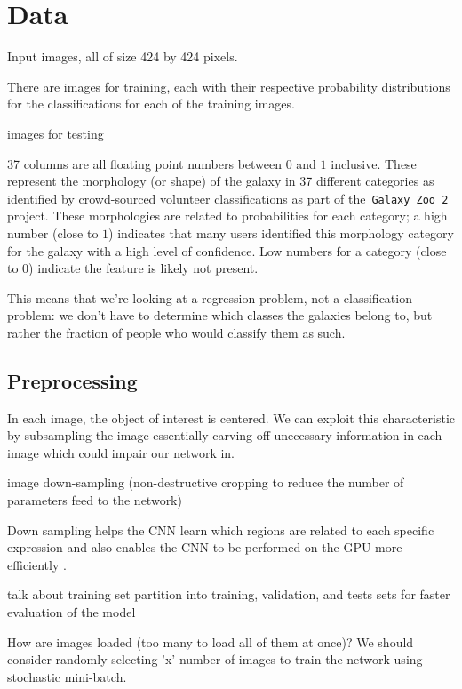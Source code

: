 \section{Data}

Input images, all of size 424 by 424 pixels.

There are  images for training, each with their respective probability distributions for the classifications for each of the training images.

 images for testing

37 columns are all floating point numbers between $0$ and $1$ inclusive. These represent the morphology (or shape) of the galaxy in 37 different categories as identified by crowd-sourced volunteer classifications as part of the~\texttt{Galaxy Zoo 2} project. These morphologies are related to probabilities for each category; a high number (close to $1$) indicates that many users identified this morphology category for the galaxy with a high level of confidence. Low numbers for a category (close to $0$) indicate the feature is likely not present.

This means that we’re looking at a regression problem, not a classification problem: we don’t have to determine which classes the galaxies belong to, but rather the fraction of people who would classify them as such.

\subsection{Preprocessing}

In each image, the object of interest is centered. We can exploit this characteristic by subsampling the image essentially carving off unecessary information in each image which could impair our network in.

image down-sampling (non-destructive cropping to reduce the number of parameters feed to the network)

Down sampling helps the CNN learn which regions are related to each specific expression and also enables the CNN to be performed on the GPU more efficiently \cite{deep-learning-review}.

talk about training set partition into training, validation, and tests sets for faster evaluation of the model

How are images loaded (too many to load all of them at once)? We should consider randomly selecting 'x' number of images to train the network using stochastic mini-batch.
